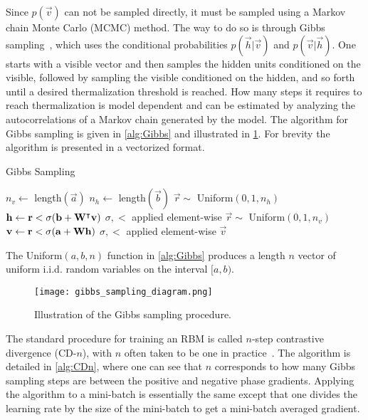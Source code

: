 Since \( p(\vec{v}) \) can not be sampled directly, it must be sampled using a Markov chain Monte Carlo (MCMC) method.
The way to do so is through Gibbs sampling~\cite{hinton_rbm_training}, which uses the conditional probabilities \( p(\vec{h}|\vec{v}) \) and \( p(\vec{v}|\vec{h}) \).
One starts with a visible vector and then samples the hidden units conditioned on the visible, followed by sampling the visible conditioned on the hidden, and so forth until a desired thermalization threshold is reached.
How many steps it requires to reach thermalization is model dependent and can be estimated by analyzing the autocorrelations of a Markov chain generated by the model.
The algorithm for Gibbs sampling is given in \cref{alg:Gibbs} and illustrated in \cref{fig:gibbs_sampling_diagram}.
For brevity the algorithm is presented in a vectorized format.

\begin{algorithm}
\caption{Gibbs Sampling}
\begin{algorithmic}[1]
        \State $n_v \gets$ length$(\vec{a})$
        \State $n_h \gets$ length$(\vec{b})$
            \State $\vec{r} \sim$ Uniform$(0, 1, n_h)$
            \State $\mathbf{h} \gets \mathbf{r} < \sigma(\mathbf{b} + \mathbf{W}^\intercal\mathbf{v})$
                \Comment $\sigma, <$ applied element-wise
            \State $\vec{r} \sim$ Uniform$(0, 1, n_v)$
            \State $\mathbf{v} \gets \mathbf{r} < \sigma(\mathbf{a} + \mathbf{W}\mathbf{h})$
                \Comment $\sigma, <$ applied element-wise
        \EndFor
        \State \Return $\vec{v}$
    \EndProcedure
\end{algorithmic}
\label{alg:Gibbs}
\end{algorithm}
The Uniform$(a, b, n)$ function in \cref{alg:Gibbs} produces a length \( n \) vector of uniform i.i.d. random variables on the interval $[a, b)$.

\begin{figure}
    \begin{center}
        \texttt{[image: gibbs\_sampling\_diagram.png]}
    \end{center}
    \caption{Illustration of the Gibbs sampling procedure.}
    \label{fig:gibbs_sampling_diagram}
\end{figure}

The standard procedure for training an RBM is called \( n \)-step contrastive divergence (CD-\( n \)), with \( n \) often taken to be one in practice~\cite{hinton_rbm_training}.
The algorithm is detailed in \cref{alg:CDn}, where one can see that \( n \) corresponds to how many Gibbs sampling steps are between the positive and negative phase gradients.
Applying the algorithm to a mini-batch is essentially the same except that one divides the learning rate by the size of the mini-batch to get a mini-batch averaged gradient.

